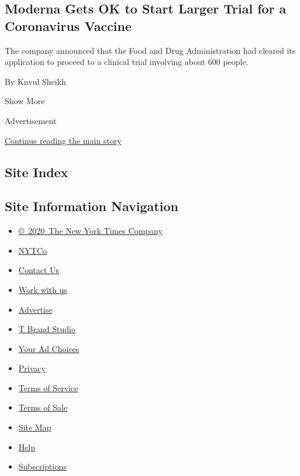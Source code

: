 \begin{enumerate}
  \hypertarget{moderna-gets-ok-to-start-larger-trial-for-a-coronavirus-vaccine}{%
  \subsection{Moderna Gets OK to Start Larger Trial for a Coronavirus
  Vaccine}\label{moderna-gets-ok-to-start-larger-trial-for-a-coronavirus-vaccine}}

  The company announced that the Food and Drug Administration had
  cleared its application to proceed to a clinical trial involving about
  600 people.

  By Knvul Sheikh
\end{enumerate}

Show More

Advertisement

\protect\hyperlink{after-mid2}{Continue reading the main story}

\hypertarget{site-index}{%
\subsection{Site Index}\label{site-index}}

\hypertarget{site-information-navigation}{%
\subsection{Site Information
Navigation}\label{site-information-navigation}}

\begin{itemize}
\tightlist
\item
  \href{https://help.nytimes.com/hc/en-us/articles/115014792127-Copyright-notice}{©~2020~The
  New York Times Company}
\end{itemize}

\begin{itemize}
\tightlist
\item
  \href{https://www.nytco.com/}{NYTCo}
\item
  \href{https://help.nytimes.com/hc/en-us/articles/115015385887-Contact-Us}{Contact
  Us}
\item
  \href{https://www.nytco.com/careers/}{Work with us}
\item
  \href{https://nytmediakit.com/}{Advertise}
\item
  \href{http://www.tbrandstudio.com/}{T Brand Studio}
\item
  \href{https://www.nytimes.com/privacy/cookie-policy\#how-do-i-manage-trackers}{Your
  Ad Choices}
\item
  \href{https://www.nytimes.com/privacy}{Privacy}
\item
  \href{https://help.nytimes.com/hc/en-us/articles/115014893428-Terms-of-service}{Terms
  of Service}
\item
  \href{https://help.nytimes.com/hc/en-us/articles/115014893968-Terms-of-sale}{Terms
  of Sale}
\item
  \href{https://spiderbites.nytimes.com}{Site Map}
\item
  \href{https://help.nytimes.com/hc/en-us}{Help}
\item
  \href{https://www.nytimes.com/subscription?campaignId=37WXW}{Subscriptions}
\end{itemize}
